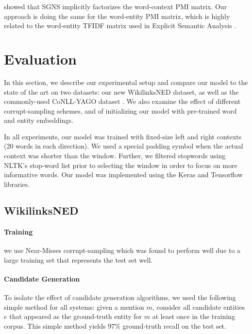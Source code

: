 \documentclass[11pt]{article}
\begin{document}
	 showed that SGNS implicitly factorizes the word-context PMI matrix. Our approach is doing the same for the word-entity PMI matrix, which is highly related to the word-entity TFIDF matrix used in Explicit Semantic Analysis \cite{gabrilovich2007computing}.
	
	\section{Evaluation}
	\label{experiments}
	
	In this section, we describe our experimental setup and compare our model to the state of the art on two datasets: our new WikilinksNED dataset, as well as the commonly-used CoNLL-YAGO dataset \cite{hoffart2011robust}. We also examine the effect of different corrupt-sampling schemes, and of initializing our model with pre-trained word and entity embeddings.
	
	In all experiments, our model was trained with fixed-size left and right contexts (20 words in each direction). We used a special padding symbol when the actual context was shorter than the window. Further, we filtered stopwords using NLTK's stop-word list prior to selecting the window in order to focus on more informative words. Our model was implemented using the Keras \cite{chollet2015} and Tensorflow \cite{tensorflow2015-whitepaper} libraries.
	
	\subsection{WikilinksNED}
	
	\paragraph{Training} we use Near-Misses corrupt-sampling which was found to perform well due to a large training set that represents the test set well.
	
	\paragraph{Candidate Generation}
	To isolate the effect of candidate generation algorithms, we used the following simple method for all systems: given a mention $m$, consider all candidate entities $e$ that appeared as the ground-truth entity for $m$ at least once in the training corpus. This simple method yields $97\%$ ground-truth recall on the test set.
	
\end{document}
